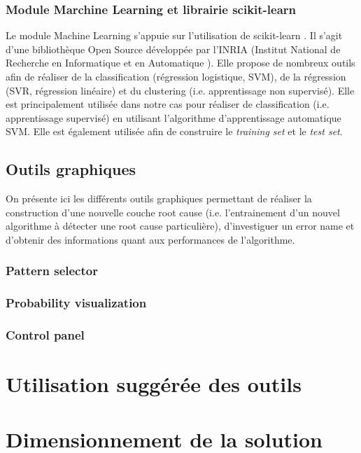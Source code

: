 \subsubsection{Module Marchine Learning et librairie scikit-learn}
\label{Industrialisation du produit: Outils: API: Le module Machine Learning}
Le module Machine Learning s'appuie sur l'utilisation de scikit-learn \cite{ScikitLearn}. Il s'agit d'une bibliothèque Open Source développée par l'INRIA (Institut National de Recherche en Informatique et en Automatique \cite{INRIA}). Elle propose de nombreux outils afin de réaliser de la classification (régression logistique, SVM), de la régression (SVR, régression linéaire) et du clustering (i.e. apprentissage non supervisé). Elle est principalement utilisée dans notre cas pour réaliser de classification (i.e. apprentissage supervisé) en utilisant l'algorithme d'apprentissage automatique SVM. Elle est également utilisée afin de construire le \emph{training set} et le \emph{test set}.

\subsection{Outils graphiques}
\label{Industrialisation du produit: Présentation des outils: Outils graphiques}
On présente ici les différents outils graphiques permettant de réaliser la construction d'une nouvelle couche root cause (i.e. l'entrainement d'un nouvel algorithme à détecter une root cause particulière), d'investiguer un error name et d'obtenir des informations quant aux performances de l'algorithme. 

\subsubsection{Pattern selector}
\label{Industrialisation du produit: Présentation des outils: Outils graphiques: Pattern selection}

\subsubsection{Probability visualization}
\label{Industrialisation du produit: Présentation des outils: Outils graphiques: Probability visualization}

\subsubsection{Control panel}
\label{Industrialisation du produit: Présentation des outils: Outils graphiques: Control panel}


\section{Utilisation suggérée des outils}
\label{Industrialisation du produit: Utilisation suggérée des outils}

\section{Dimensionnement de la solution}
\label{Industrialisation du produit: Dimensionnement de la solution}